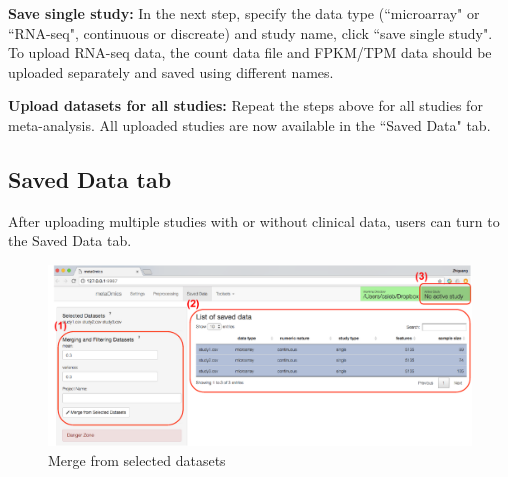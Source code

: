 \begin{steps}
\item \textbf{Save single study:}
In the next step,
specify the data type (``microarray" or ``RNA-seq", continuous or discreate) and study name,
click ``save single study".
To upload RNA-seq data, the count data file and FPKM/TPM
 data should be uploaded separately and saved using different names.

\item \textbf{Upload datasets for all studies:}
Repeat the steps above for all studies for meta-analysis.
All uploaded studies are now available in the ``Saved Data" tab. 
 
\end{steps}

\subsection{Saved Data tab}
\label{sec:saved}

After uploading multiple studies with or without clinical data,
users can turn to the Saved Data tab.

\begin{figure}[H]
\begin{center}
\includegraphics[scale=0.8]{./figure/preprocessing/GUImerge.pdf}
\caption{Merge from selected datasets}
\label{fig:GUImerge}
\end{center}
\end{figure}


